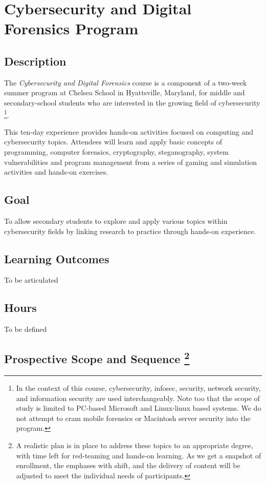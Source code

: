 \documentclass[letterpaper,10pt,english]{sphinxmanual}
\begin{document}
\chapter{Cybersecurity and Digital Forensics Program}
\label{cybersecurity::doc}\label{cybersecurity:cybersecurity-and-digital-forensics-program}

\section{Description}
\label{cybersecurity:description}
The \emph{Cybersecurity and Digital Forensics} course is a component of a two-week summer program at Chelsea School in Hyattsville, Maryland, for middle and secondary-school students who are interested in the growing field of cybersecurity \footnote{
In the context of this course, cybersecurity, infosec, security, network security, and information security are used interchangeably. Note too that the scope of study is limited to PC-based Microsoft and Linux-linux based systems. We do not attempt to cram mobile forensics or Macintosh server security into the program.
}.

This ten-day experience provides hands-on activities focused on computing and cybersecurity topics. Attendees will learn and apply basic concepts of programming, computer forensics, cryptography, steganography, system vulnerabilities and program management from a series of gaming and simulation activities and hands-on exercises.


\section{Goal}
\label{cybersecurity:goal}
To allow secondary students to explore and apply various topics within cybersecurity fields by linking research to practice through hands-on experience.


\section{Learning Outcomes}
\label{cybersecurity:learning-outcomes}
To be articulated


\section{Hours}
\label{cybersecurity:hours}
To be defined


\section{Prospective Scope and Sequence \footnote{
A realistic plan is in place to address these topics to an appropriate degree, with time left for red-teaming and hands-on learning. As we get a snapshot of enrollment, the emphases with shift, and the delivery of content will be adjusted to meet the individual needs of participants.
}}
\label{cybersecurity:prospective-scope-and-sequence-2}
\end{document}
